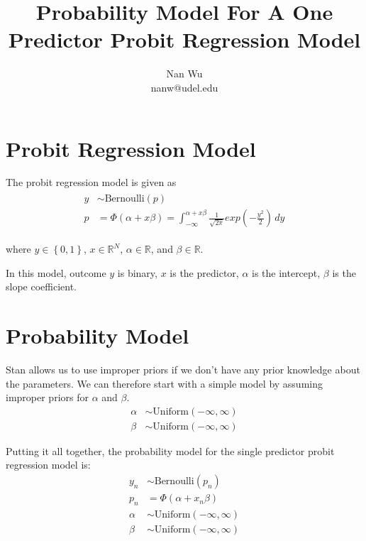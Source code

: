 \documentclass[12pt]{article}
\begin{document}
\title{Probability Model For A One Predictor Probit Regression Model}
\author{Nan Wu \\ nanw@udel.edu}
\date{}
\maketitle

\section{Probit Regression Model}

The probit regression model is given as
\begin{align}
\begin{split}
  y &\sim \mathrm{Bernoulli} \left( p\right) \\
  p &=\Phi \left(\alpha + x\beta \right)=\int_{-\infty}^{\alpha+x\beta}\frac{1}{\sqrt{2\pi}}exp\left(-\frac{y^2}{2}\right)\,dy
\end{split}
\end{align}

where $y \in \left\{0,1\right\}$, $x\in \mathbb{R}^N$, $\alpha \in \mathbb{R}$, and $\beta \in \mathbb{R}$.

In this model, outcome $y$ is binary, $x$ is the predictor, $\alpha$ is the intercept, $\beta$ is the slope coefficient.

\section{Probability Model}

Stan allows us to use improper priors if we don't have any prior knowledge about the parameters. We can therefore start with a simple model by assuming improper priors for $\alpha$ and $\beta$.
\begin{align*}
\alpha &\sim \mathrm{Uniform}\left( -\infty,\infty \right) \\
\beta &\sim \mathrm{Uniform}\left( -\infty,\infty \right)
\end{align*}

Putting it all together, the probability model for the single predictor probit regression model is:
\begin{align*}
y_n &\sim \mathrm{Bernoulli} \left( p_n\right) \\
p_n &=\Phi \left( \alpha + x_n\beta \right) \\
\alpha &\sim \mathrm{Uniform}\left( -\infty,\infty \right) \\
\beta &\sim \mathrm{Uniform}\left( -\infty,\infty \right)
\end{align*}
\end{document}
